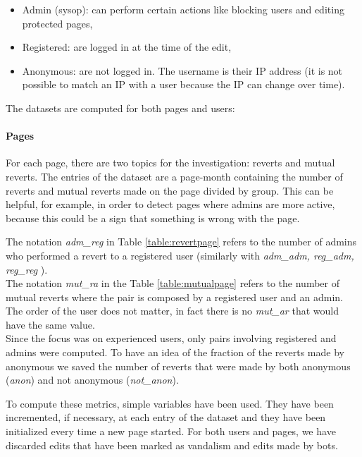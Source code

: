 \begin{itemize}
    \item Admin (sysop): can perform certain actions like blocking users and editing protected pages, 
    \item Registered: are logged in at the time of the edit, 
    \item Anonymous: are not logged in. The username is their IP address (it is not possible to match an IP with a user
        because the IP can change over time).
\end{itemize}

The datasets are computed for both pages and users: 
\paragraph*{Pages} 
For each page, there are two topics for the investigation: reverts and mutual reverts. The entries of the
dataset are a page-month containing the number of reverts and mutual reverts made on the page
divided by group. This can be helpful, for example, in order to detect pages where admins are more active, because
this could be a sign that something is wrong with the page.



The notation \textit{adm\_reg} in Table \ref{table:revertpage} refers to the number of admins who performed a
revert to a registered user (similarly with \textit{adm\_adm, reg\_adm, reg\_reg} ).\\

The notation \textit{mut\_ra} in the Table \ref{table:mutualpage} refers to the number of mutual
reverts where the pair is composed by a registered user and an admin. The order of the user does not
matter, in fact there is no \textit{mut\_ar} that would have the same value.\\


Since the focus was on experienced users, only pairs involving registered and admins were computed.
To have an idea of the fraction of the reverts made by anonymous we saved the number of reverts
that were made by both anonymous (\textit{anon}) and not anonymous (\textit{not\_anon}).

To compute these metrics, simple variables have been used. They have been incremented, if
necessary, at each entry of the dataset and they have been initialized every time a new page 
started. For both users and pages, we have discarded edits that have been marked as vandalism and
edits made by bots.

